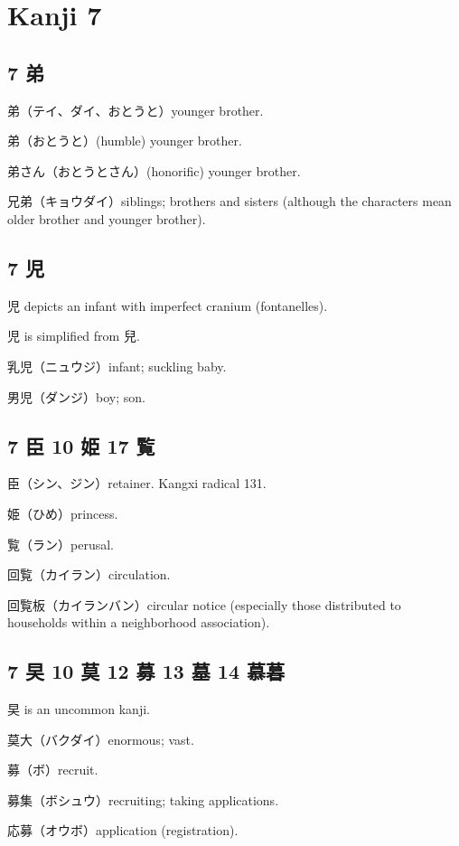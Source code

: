 \chapter{Kanji 7}

\section{7 弟}

弟（テイ、ダイ、おとうと）younger brother.

弟（おとうと）(humble) younger brother.

弟さん（おとうとさん）(honorific) younger brother.

兄弟（キョウダイ）siblings;
brothers and sisters
(although the characters mean older brother and younger brother).

\section{7 児}

児 depicts an infant with imperfect cranium (fontanelles).

児 is simplified from 兒.

乳児（ニュウジ）infant; suckling baby.

男児（ダンジ）boy; son.

\section{7 臣 10 姫 17 覧}

臣（シン、ジン）retainer.
Kangxi radical 131.

姫（ひめ）princess.

覧（ラン）perusal.

回覧（カイラン）circulation.

回覧板（カイランバン）circular notice
(especially those distributed to households within a neighborhood association).

\section{7 旲 10 莫 12 募 13 墓 14 慕暮}

旲 is an uncommon kanji.

莫大（バクダイ）enormous; vast.

募（ボ）recruit.

募集（ボシュウ）recruiting; taking applications.

応募（オウボ）application (registration).

